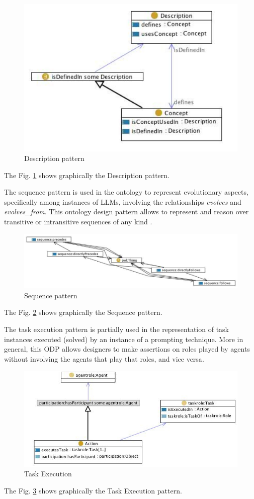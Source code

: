 \begin{figure}[H]
    \centering
    \includegraphics[width=0.6\linewidth]{Figures/fig_73.png}
    \caption{Description pattern}
    \label{fig:73}
\end{figure}
The Fig. \ref{fig:73} shows graphically the Description pattern.

The sequence pattern is used in the ontology to represent evolutionary aspects, specifically among instances of LLMs, involving the relationships \textit{evolves} and \textit{evolves\_from}.
This ontology design pattern allows to represent and reason over transitive or intransitive sequences of any kind \cite{sequence_pattern}.
\begin{figure}[H]
    \centering
    \includegraphics[width=0.8\linewidth]{Figures/fig_74.png}
    \caption{Sequence pattern}
    \label{fig:74}
\end{figure}
The Fig. \ref{fig:74} shows graphically the Sequence pattern.

The task execution pattern is partially used in the representation of task instances executed (solved) by an instance of a prompting technique. More in general, this ODP allows designers to make assertions on roles played by agents without involving the agents that play that roles, and vice versa\cite{task_execution}.

\begin{figure}[H]
    \centering
    \includegraphics[width=0.8\linewidth]{Figures/fig_75.png}
    \caption{Task Execution}
    \label{fig:75}
\end{figure}
The Fig. \ref{fig:75} shows graphically the Task Execution pattern.

